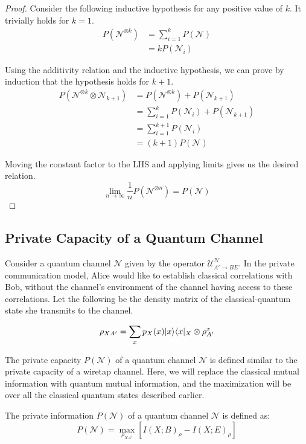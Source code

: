 \begin{proof}
Consider the following inductive hypothesis for any positive value of $k$. It trivially holds for $k=1$.
\begin{align*}
P(\mathcal{N}^{\otimes k}) &= \sum_{i=1}^k P(\mathcal{N}) \\
&= k P(\mathcal{N}_i)
\end{align*}

Using the additivity relation and the inductive hypothesis, we can prove by induction that the hypothesis holds for $k+1$.
\begin{align*}
P(\mathcal{N}^{\otimes k} \otimes \mathcal{N}_{k+1}) &= P(\mathcal{N}^{\otimes k}) + P(\mathcal{N}_{k+1}) \\
&= \sum_{i=1}^{k} P(\mathcal{N}_i) + P(\mathcal{N}_{k+1}) \\
&= \sum_{i=1}^{k+1} P(\mathcal{N}_i) \\
&= (k+1) P(\mathcal{N})
\end{align*}

Moving the constant factor to the LHS and applying limits gives us the desired relation.
$$\lim_{n \rightarrow \infty} \frac{1}{n} P(\mathcal{N}^{\otimes n}) = P(\mathcal{N})$$
\end{proof}

\subsection{Private Capacity of a Quantum Channel}

Consider a quantum channel $\mathcal{N}$ given by the operator $\mathcal{U}_{A' \rightarrow BE}^{\mathcal{N}}$. In the private communication model, Alice would like to establish classical correlations with Bob, without the channel's environment of the channel having access to these correlations. Let the following be the density matrix of the classical-quantum state she transmits to the channel.

$$\rho_{XA'} = \sum_{x} p_X(x) \lvert x\rangle\langle x\rvert_X \otimes \rho_{A'}^x $$

The private capacity $P(\mathcal{N})$ of a quantum channel $\mathcal{N}$ is defined similar to the private capacity of a wiretap channel. Here, we will replace the classical mutual information with quantum mutual information, and the maximization will be over all the classical quantum states described earlier.

\begin{definition}
The private information $P(\mathcal{N})$ of a quantum channel $\mathcal{N}$ is defined as:
$$P(\mathcal{N}) = \max_{\rho_{XA'}} \left[ I(X;B)_\rho - I(X;E)_\rho \right]$$
\end{definition}

